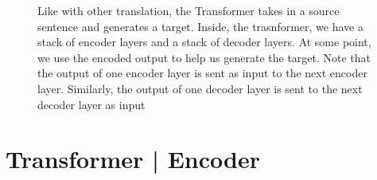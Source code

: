 \documentclass[11pt]{article}
\begin{document}
\begin{figure}[H]
    \centering
    \caption*{Like with other translation, the Transformer takes in a source sentence and generates a target. Inside, the trasnformer, we have a stack of encoder layers and a stack of decoder layers. At some point, we use the encoded output to help us generate the target. Note that the output of one encoder layer is sent as input to the next encoder layer. Similarly, the output of one decoder layer is sent to the next decoder layer as input}
\end{figure}

\section{Transformer | Encoder}
\end{document}
